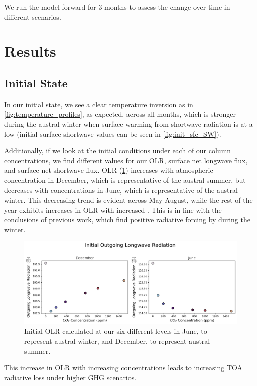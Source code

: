 \documentclass[12]{article}
\begin{document}
We run the model forward for 3 months to assess the change over time in different  scenarios.

\section{Results}
\subsection{Initial State}
In our initial state, we see a clear temperature inversion as in \ref{fig:temperature_profiles}, as expected, across all months, which is stronger during the austral winter when surface warming from shortwave radiation is at a low (initial surface shortwave values can be seen in \ref{fig:init_sfc_SW}). 

Additionally, if we look at the initial conditions under each of our column  concentrations, we find different values for our OLR, surface net longwave flux, and surface net shortwave flux. OLR (\ref{fig:init_OLR}) increases with atmospheric  concentration in December, which is representative of the austral summer, but decreases with  concentrations in June, which is representative of the austral winter. This decreasing trend is evident across May-August, while the rest of the year exhibits increases in OLR with increased . This is in line with the conclusions of previous work, which find positive radiative forcing by  during the winter\citep{schmithusen_how_2015}. 

\begin{figure}[htb!]
\noindent\includegraphics[width=1\textwidth]{figures/OLR_init.png}
\centering
\caption{Initial OLR calculated at our six different  levels in June, to represent austral winter, and December, to represent austral summer.}
\label{fig:init_OLR}
\end{figure}

This increase in OLR with increasing  concentrations leads to increasing TOA radiative loss under higher GHG scenarios. 
\end{document}
